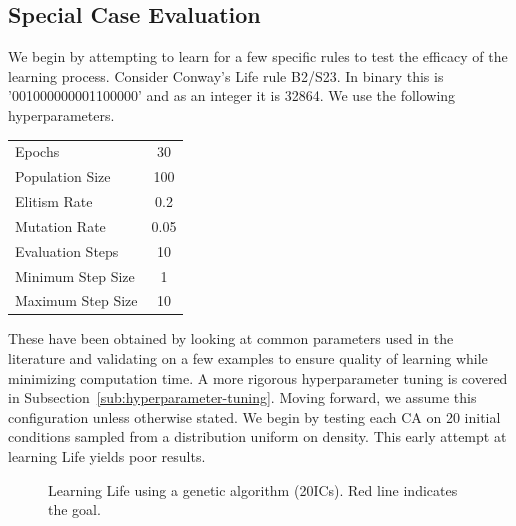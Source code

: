 \subsection{Special Case Evaluation}

We begin by attempting to learn for a few specific rules to test the efficacy of the learning process. Consider Conway's Life rule B2/S23. In binary this is '001000000001100000' and as an integer it is 32864. We use the following hyperparameters.
\begin{center}
    \begin{tabular}{ l c }
        Epochs & 30\\
        Population Size & 100\\
        Elitism Rate & 0.2\\
        Mutation Rate & 0.05\\
        Evaluation Steps & 10\\
        Minimum Step Size & 1\\
        Maximum Step Size & 10\\
    \end{tabular}
\end{center}
These have been obtained by looking at common parameters used in the literature and validating on a few examples to ensure quality of learning while minimizing computation time. A more rigorous hyperparameter tuning is covered in Subsection~\ref{sub:hyperparameter-tuning}. Moving forward, we assume this configuration unless otherwise stated. We begin by testing each CA on 20 initial conditions sampled from a distribution uniform on density. This early attempt at learning Life yields poor results.

\begin{figure}[!h]
\centering
            \hfill
            \hfill
            \caption{Learning Life using a genetic algorithm (20ICs). Red line indicates the goal.}
\label{fig:life-nothing}
\end{figure}

